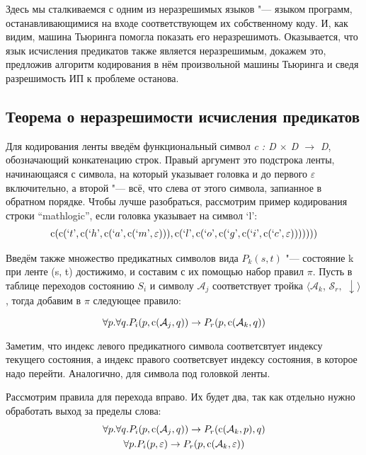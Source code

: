 Здесь мы сталкиваемся с одним из неразрешимых языков "--- языком программ, останавливающимися на входе
соответствующем их собственному коду. И, как видим, машина Тьюринга помогла показать его неразрешимоть.
Оказывается, что язык исчисления предикатов также является неразрешимым, докажем это, предложив алгоритм
кодирования в нём произвольной машины Тьюринга и сведя разрешимость ИП к проблеме останова.

\subsection{Теорема о неразрешимости исчисления предикатов}

Для кодирования ленты введём функциональный символ \textit{c : D $\times$ D $\rightarrow$ D}, обозначающий
конкатенацию строк. Правый аргумент это подстрока ленты, начинающаяся с символа, на который указывает
головка и до первого $\varepsilon$ включительно, а второй "--- всё, что слева от этого символа, запианное
в обратном порядке. Чтобы лучше разобраться, рассмотрим пример кодирования строки ``mathlogic'', если
головка указывает на символ `l':
\begin{gather*}
     \operatorname{c}(\operatorname{c}(`t\text{'}, \operatorname{c}(`h\text{'}, \operatorname{c}(`a\text{'}, \operatorname{c}(`m\text{'}, \varepsilon))), \operatorname{c}(`l\text{'}, \operatorname{c}(`o\text{'}, \operatorname{c}(`g\text{'}, \operatorname{c}(`i\text{'}, \operatorname{c}(`c\text{'}, \varepsilon))))))) 
\end{gather*}

Введём также множество предикатных символов вида $P_k(s, t)$ "--- состояние k при ленте (s, t) достижимо,
и составим с их помощью набор правил $\pi$. Пусть в таблице переходов состоянию $S_i$ и символу
$\mathcal{A}_j$ соответствует тройка $\langle\mathcal{A}_k$,  $\mathcal{S}_r,$ $\downarrow\rangle$, тогда
добавим в $\pi$ следующее правило:

\[\forall p.\forall q.P_i(p, \operatorname{c}(\mathcal{A}_j, q))\to P_r(p, \operatorname{c}(\mathcal{A}_k, q))\]

Заметим, что индекс левого предикатного символа соответсвтует индексу текущего состояния, а индекс
правого соответсвует индексу состояния, в которое надо перейти. Аналогично, для символа под головкой
ленты.

Рассмотрим правила для перехода вправо. Их будет два, так как отдельно нужно обработать
выход за пределы слова:
\begin{gather}
    \forall p.\forall q.P_i(p, \operatorname{c}(\mathcal{A}_j, q))\to P_r(\operatorname{c}(\mathcal{A}_k, p), q) \\
    \forall p.P_i(p, \varepsilon)\to P_r(p, \operatorname{c}(\mathcal{A}_k, \varepsilon))
\end{gather}

